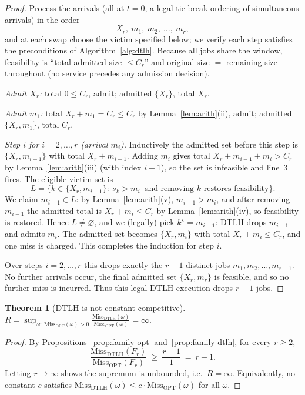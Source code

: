\documentclass{amsart}
\newtheorem{theorem}{Theorem}
\theoremstyle{definition}
\begin{document}
\begin{proof}
Process the arrivals (all at $t=0$, a legal tie-break ordering of simultaneous
arrivals) in the order
\[
X_r,\ m_1,\ m_2,\ \dots,\ m_r,
\]
and at each swap choose the victim specified below; we verify each step satisfies
the preconditions of Algorithm~\ref{alg:dtlh}. Because all jobs share the window,
feasibility is ``total admitted size $\le C_r$'' and original size $=$ remaining
size throughout (no service precedes any admission decision).

\emph{Admit $X_r$:} total $0\le C_r$, admit; admitted $\{X_r\}$, total $X_r$.

\emph{Admit $m_1$:} total $X_r+m_1=C_r\le C_r$ by
Lemma~\ref{lem:arith}(ii), admit; admitted $\{X_r,m_1\}$, total $C_r$.

\emph{Step $i$ for $i=2,\dots,r$ (arrival $m_i$).} Inductively the admitted set
before this step is $\{X_r,m_{i-1}\}$ with total $X_r+m_{i-1}$. Adding $m_i$
gives total $X_r+m_{i-1}+m_i>C_r$ by Lemma~\ref{lem:arith}(iii)
(with index $i-1$), so the set is infeasible and line~3 fires. The eligible
victim set is
\[
L=\{k\in\{X_r,m_{i-1}\}:\ s_k>m_i\ \text{ and removing }k\text{ restores
feasibility}\}.
\]
We claim $m_{i-1}\in L$: by Lemma~\ref{lem:arith}(v), $m_{i-1}>m_i$, and after
removing $m_{i-1}$ the admitted total is $X_r+m_i\le C_r$ by
Lemma~\ref{lem:arith}(iv), so feasibility is restored. Hence $L\neq\varnothing$,
and we (legally) pick $k^\star=m_{i-1}$: DTLH drops $m_{i-1}$ and admits $m_i$.
The admitted set becomes $\{X_r,m_i\}$ with total $X_r+m_i\le C_r$, and one miss
is charged. This completes the induction for step $i$.

Over steps $i=2,\dots,r$ this drops exactly the $r-1$ distinct jobs
$m_1,m_2,\dots,m_{r-1}$. No further arrivals occur, the final admitted set
$\{X_r,m_r\}$ is feasible, and so no further miss is incurred. Thus this legal
DTLH execution drops $r-1$ jobs.
\end{proof}

\begin{theorem}[DTLH is not constant-competitive]\label{thm:main}
$\displaystyle R=\sup_{\omega:\ \mathrm{Miss}_{\mathrm{OPT}}(\omega)>0}
\frac{\mathrm{Miss}_{\mathrm{DTLH}}(\omega)}{\mathrm{Miss}_{\mathrm{OPT}}(\omega)}
=\infty.$
\end{theorem}

\begin{proof}
By Propositions~\ref{prop:family-opt} and~\ref{prop:family-dtlh}, for every
$r\ge 2$,
\[
\frac{\mathrm{Miss}_{\mathrm{DTLH}}(F_r)}{\mathrm{Miss}_{\mathrm{OPT}}(F_r)}
\ \ge\ \frac{r-1}{1}\ =\ r-1 .
\]
Letting $r\to\infty$ shows the supremum is unbounded, i.e.\ $R=\infty$.
Equivalently, no constant $c$ satisfies
$\mathrm{Miss}_{\mathrm{DTLH}}(\omega)\le c\cdot\mathrm{Miss}_{\mathrm{OPT}}(\omega)$
for all $\omega$.
\end{proof}
\end{document}
